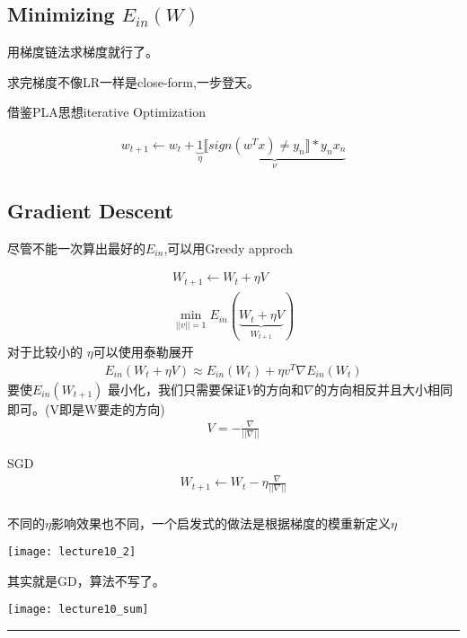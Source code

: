 \subsection{Minimizing $E_{in}(W)$}
用梯度链法求梯度就行了。 \par
求完梯度不像LR一样是close-form,一步登天。 \par
借鉴PLA思想iterative Optimization \par
\begin{align*}
w_{t+1} \gets w_t + \underbrace{1}_\eta \underbrace{\llbracket sign(w^Tx) \neq y_n\rrbracket * y_nx_n }_{\nu}
\end{align*}

\subsection{Gradient Descent}
尽管不能一次算出最好的$E_{in}$,可以用Greedy approch \par
\begin{align*}
W_{t+1} \gets W_t + \eta V \\
\underset{||v||=1}{\min} E_{in}(\underbrace{W_t+ \eta V}_{W_{t+1}})
\end{align*}
对于比较小的 $\eta$可以使用泰勒展开 
\begin{align*}
E_{in}(W_t+\eta V) \approx E_{in}(W_t) + \eta v^T \nabla E_{in}(W_t)
\end{align*}
要使$E_{in}(W_{t+1})$ 最小化，我们只需要保证$V$的方向和$\nabla$的\textcolor{mypink2}{方向相反}并且大小相同即可。(V即是W要走的方向)
\begin{align*}
V = -\frac{\nabla}{||\nabla||}
\end{align*}
\begin{myremark}{SGD}
\begin{align*}
W_{t+1} \gets W_t - \eta \frac{\nabla}{||\nabla||}  \\
\end{align*}
\end{myremark}
不同的$\eta$影响效果也不同，一个启发式的做法是根据梯度的模重新定义$\eta$ \par
\begin{center}
\texttt{[image: lecture10\_2]}\\
\end{center}
其实就是GD，算法不写了。
\begin{center}
\texttt{[image: lecture10\_sum]}\\
\end{center}
\noindent
{\color{RubineRed} \rule{\linewidth}{1mm} }